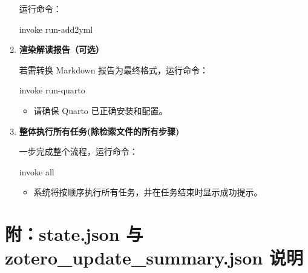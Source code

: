 \documentclass[
  letterpaper,
  DIV=11,
  numbers=noendperiod]{scrreprt}
\newenvironment{Shaded}{\begin{snugshade}}{\end{snugshade}}
\newcommand{\ExtensionTok}[1]{\textcolor[rgb]{0.00,0.23,0.31}{#1}}
\newcommand{\NormalTok}[1]{\textcolor[rgb]{0.00,0.23,0.31}{#1}}
\providecommand{\tightlist}{%
  \setlength{\itemsep}{0pt}\setlength{\parskip}{0pt}}\usepackage{longtable,booktabs,array}
\begin{document}
\begin{enumerate}
  运行命令：

\begin{Shaded}
\begin{Highlighting}[]
\ExtensionTok{invoke}\NormalTok{ run{-}add2yml}
\end{Highlighting}
\end{Shaded}
\item
  \textbf{渲染解读报告（可选）}

  若需转换 Markdown 报告为最终格式，运行命令：

\begin{Shaded}
\begin{Highlighting}[]
\ExtensionTok{invoke}\NormalTok{ run{-}quarto}
\end{Highlighting}
\end{Shaded}

  \begin{itemize}
  \tightlist
  \item
    请确保 Quarto 已正确安装和配置。
  \end{itemize}
\item
  \textbf{整体执行所有任务(除检索文件的所有步骤)}

  一步完成整个流程，运行命令：

\begin{Shaded}
\begin{Highlighting}[]
\ExtensionTok{invoke}\NormalTok{ all}
\end{Highlighting}
\end{Shaded}

  \begin{itemize}
  \tightlist
  \item
    系统将按顺序执行所有任务，并在任务结束时显示成功提示。
  \end{itemize}
\end{enumerate}

\section{附：state.json 与 zotero\_update\_summary.json
说明}\label{ux9644state.json-ux4e0e-zotero_update_summary.json-ux8bf4ux660e}
\end{document}

